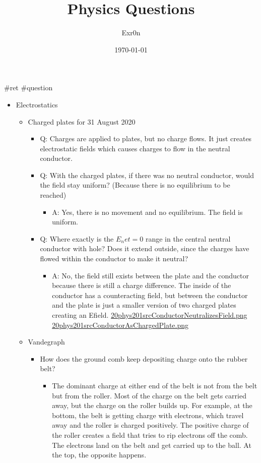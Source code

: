 \documentclass[letterpaper]{article}
\author{Exr0n}
\date{\today}
\title{Physics Questions}
\renewcommand{\tableofcontents}{}
\begin{document}
\tableofcontents

\#ret \#question

\begin{itemize}
\item Electrostatics

\begin{itemize}
\item Charged plates for 31 August 2020

\begin{itemize}
\item Q: Charges are applied to plates, but no charge flows. It just
creates electrostatic fields which causes charges to flow in the
neutral conductor.
\item Q: With the charged plates, if there was no neutral conductor,
would the field stay uniform? (Because there is no equilibrium to
be reached)

\begin{itemize}
\item A: Yes, there is no movement and no equilibrium. The field is
uniform.
\end{itemize}

\item Q: Where exactly is the \(E_net = 0\) range in the central neutral
conductor with hole? Does it extend outside, since the charges
have flowed within the conductor to make it neutral?

\begin{itemize}
\item A: No, the field still exists between the plate and the
conductor because there is still a charge difference. The inside
of the conductor has a counteracting field, but between the
conductor and the plate is just a smaller version of two charged
plates creating an Efield.
\href{20phys201srcConductorNeutralizesField.png.org}{20phys201srcConductorNeutralizesField.png}
\href{20phys201srcConductorAsChargedPlate.png.org}{20phys201srcConductorAsChargedPlate.png}
\end{itemize}
\end{itemize}

\item Vandegraph

\begin{itemize}
\item How does the ground comb keep depositing charge onto the rubber
belt?

\begin{itemize}
\item The dominant charge at either end of the belt is not from the
belt but from the roller. Most of the charge on the belt gets
carried away, but the charge on the roller builds up. For
example, at the bottom, the belt is getting charge with
electrons, which travel away and the roller is charged
positively. The positive charge of the roller creates a field
that tries to rip electrons off the comb. The electrons land on
the belt and get carried up to the ball. At the top, the
opposite happens.
\end{itemize}


\end{itemize}
\end{itemize}
\end{itemize}
\end{document}
